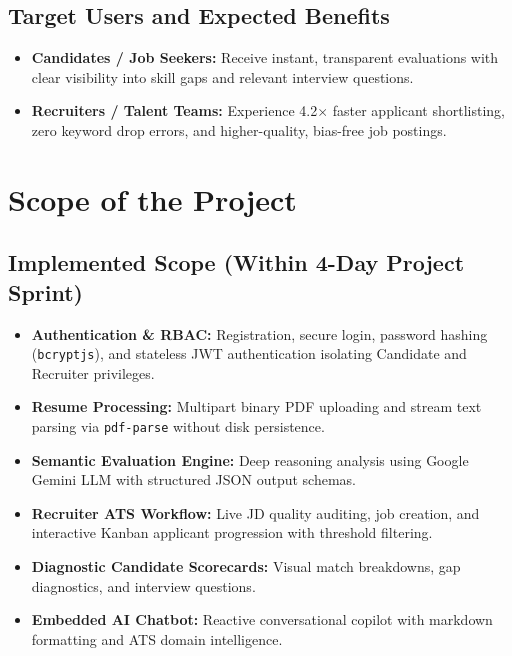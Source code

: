 \documentclass[12pt, a4paper]{article}
\begin{document}
\subsection{Target Users and Expected Benefits}
\begin{itemize}[leftmargin=1.5em, itemsep=2pt]
    \item \textbf{Candidates / Job Seekers:} Receive instant, transparent evaluations with clear visibility into skill gaps and relevant interview questions.
    \item \textbf{Recruiters / Talent Teams:} Experience 4.2$\times$ faster applicant shortlisting, zero keyword drop errors, and higher-quality, bias-free job postings.
\end{itemize}

\newpage

\section{Scope of the Project}

\subsection{Implemented Scope (Within 4-Day Project Sprint)}
\begin{itemize}[leftmargin=1.5em, itemsep=2pt]
    \item \textbf{Authentication \& RBAC:} Registration, secure login, password hashing (\texttt{bcryptjs}), and stateless JWT authentication isolating Candidate and Recruiter privileges.
    \item \textbf{Resume Processing:} Multipart binary PDF uploading and stream text parsing via \texttt{pdf-parse} without disk persistence.
    \item \textbf{Semantic Evaluation Engine:} Deep reasoning analysis using Google Gemini LLM with structured JSON output schemas.
    \item \textbf{Recruiter ATS Workflow:} Live JD quality auditing, job creation, and interactive Kanban applicant progression with threshold filtering.
    \item \textbf{Diagnostic Candidate Scorecards:} Visual match breakdowns, gap diagnostics, and interview questions.
    \item \textbf{Embedded AI Chatbot:} Reactive conversational copilot with markdown formatting and ATS domain intelligence.
\end{itemize}
\end{document}

